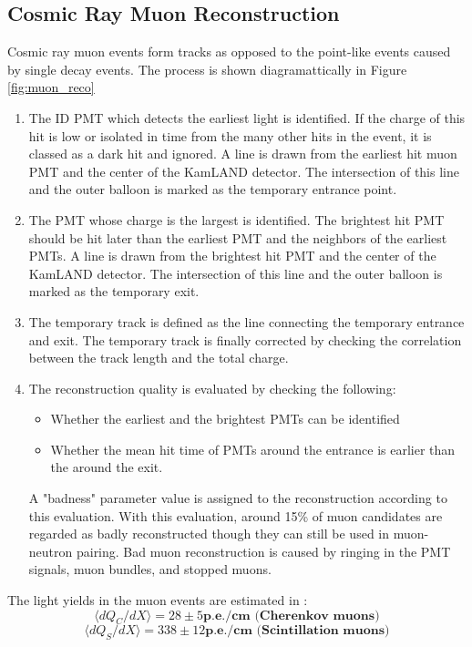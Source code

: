 \subsection{Cosmic Ray Muon Reconstruction}
Cosmic ray muon events form tracks as opposed to the point-like events caused by single decay events. The process is shown diagramattically in Figure \ref{fig:muon_reco}
\begin{enumerate}
	\item The ID PMT which detects the earliest light is identified. If the charge of this hit is low or isolated in time from the many other hits in the event, it is classed as a dark hit and ignored. A line is drawn from the earliest hit muon PMT and the center of the KamLAND detector. The intersection of this line and the outer balloon is marked as the temporary entrance point.
	\item The PMT whose charge is the largest is identified. The brightest hit PMT should be hit later than the earliest PMT and the neighbors of the earliest PMTs. A line is drawn from the brightest hit PMT and the center of the KamLAND detector. The intersection of this line and the outer balloon is marked as the temporary exit.
	\item The temporary track is defined as the line connecting the temporary entrance and exit. The temporary track is finally corrected by checking the correlation between the track length and the total charge.
	\item The reconstruction quality is evaluated by checking the following:
	\begin{itemize}
		\item Whether the earliest and the brightest PMTs can be identified
		\item Whether the mean hit time of PMTs around the entrance is earlier than the around the exit.
	\end{itemize}
	A "badness" parameter value is assigned to the reconstruction according to this evaluation. With this evaluation, around 15\% of muon candidates are regarded as badly reconstructed though they can still be used in muon-neutron pairing. Bad muon reconstruction is caused by ringing in the PMT signals, muon bundles, and stopped muons.
\end{enumerate}
The light yields in the muon events are estimated in \cite{karino_master}:
\begin{equation}
	\langle dQ_C/dX\rangle =28\pm 5\textbf{p.e./cm (Cherenkov muons)}
\end{equation}
\begin{equation}
	\langle dQ_S/dX\rangle =338\pm 12\textbf{p.e./cm (Scintillation muons)}
\end{equation}
